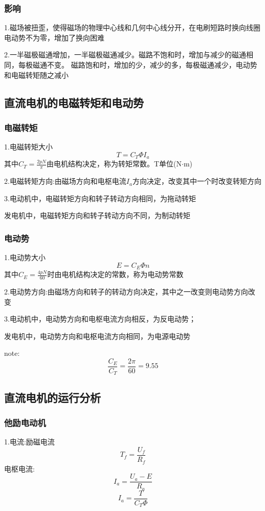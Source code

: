 \documentclass[11pt,twoside,a4paper]{ctexart}
\begin{document}
    \subsubsection{影响}
    1.磁场被扭歪，使得磁场的物理中心线和几何中心线分开，在电刷短路时换向线圈
    电动势不为零，增加了换向困难

    2.一半磁极磁通增加，一半磁极磁通减少。磁路不饱和时，增加与减少的磁通相同，每极磁通不变。
    磁路饱和时，增加的少，减少的多，每极磁通减少，电动势和电磁转矩随之减小

    \subsection{直流电机的电磁转矩和电动势}

    \subsubsection{电磁转矩}
    1.电磁转矩大小
    \[T = C_T\varPhi I_a\]
    其中$C_T = \frac{2pN}{\pi}$由电机结构决定，称为转矩常数。T单位(N$\cdot $m)

    2.电磁转矩方向:由磁场方向和电枢电流$I_a$方向决定，改变其中一个时改变转矩方向

    3.电动机中，电磁转矩方向和转子转动方向相同，为拖动转矩

    发电机中，电磁转矩方向和转子转动方向不同，为制动转矩
    \subsubsection{电动势}
    1.电动势大小
    \[E = C_E\varPhi n\]
    其中$C_E = \frac{4pN}{60}$时由电机结构决定的常数，称为电动势常数

    2.电动势方向:由磁场方向和转子的转动方向决定，其中之一改变则电动势方向改变

    3.电动机中，电动势方向和电枢电流方向相反，为反电动势；

    发电机中，电动势方向和电枢电流方向相同，为电源电动势

    note:
    \[\frac{C_E}{C_T} = \frac{2\pi}{60} = 9.55\]

    \subsection{直流电机的运行分析}
    \subsubsection{他励电动机}
    1.电流:励磁电流
    \[T_f = \frac{U_f}{R_f}\]
    电枢电流:
    \[I_a = \frac{U_a - E}{R_a}\]
    \[I_a = \frac{T}{C_T\varPhi }\]
\end{document}
